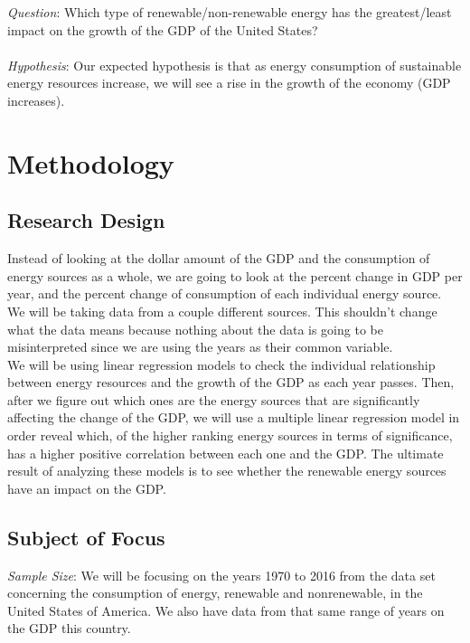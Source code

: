 \documentclass[14pt, titlepage]{article}
\begin{document}
		\textit{Question}: Which type of renewable/non-renewable energy has the greatest/least impact on the growth of the GDP of the United States? \\ \\ \textit{Hypothesis}: Our expected hypothesis is that as energy consumption of sustainable energy resources increase, we will see a rise in the growth of the economy (GDP increases). 
		
	\section*{Methodology}

		\subsection*{Research Design}
			
			Instead of looking at the dollar amount of the GDP and the consumption of energy sources as a whole, we are going to look at the percent change in GDP per year, and the percent change of consumption of each individual energy source. \\ We will be taking data from a couple different sources. This shouldn’t change what the data means because nothing about the data is going to be misinterpreted since we are using the years as their common variable. \\ We will be using linear regression models to check the individual relationship between energy resources and the growth of the GDP as each year passes. Then, after we figure out which ones are the energy sources that are significantly affecting the change of the GDP, we will use a multiple linear regression model in order reveal which, of the higher ranking energy sources in terms of significance, has a higher positive correlation between each one and the GDP. The ultimate result of analyzing these models is to see whether the renewable energy sources have an impact on the GDP.
			
		\subsection*{Subject of Focus}
		
			\textit{Sample Size}: We will be focusing on the years 1970 to 2016 from the data set concerning the consumption of energy, renewable and nonrenewable, in the United States of America. We also have data from that same range of years on the GDP this country. 
\end{document}
